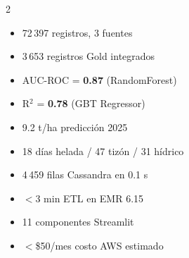 \documentclass[11pt,a4paper]{article}
\begin{document}
\vspace{0.5em}
\begin{tcolorbox}[colback=agroclear!40, colframe=agrolight,
  title=M\'etricas clave para mencionar en la presentaci\'on,
  fonttitle=\bfseries\color{white}, colbacktitle=agrolight]
\begin{multicols}{2}
\begin{itemize}
  \item 72\,397 registros, 3 fuentes
  \item 3\,653 registros Gold integrados
  \item AUC-ROC = \textbf{0.87} (RandomForest)
  \item R$^2$ = \textbf{0.78} (GBT Regressor)
  \item 9.2 t/ha predicci\'on 2025
  \item 18 d\'ias helada / 47 tiz\'on / 31 h\'idrico
  \item 4\,459 filas Cassandra en 0.1 s
  \item $<$3 min ETL en EMR 6.15
  \item 11 componentes Streamlit
  \item $<$\$50/mes costo AWS estimado
\end{itemize}
\end{multicols}
\end{tcolorbox}
\end{document}
